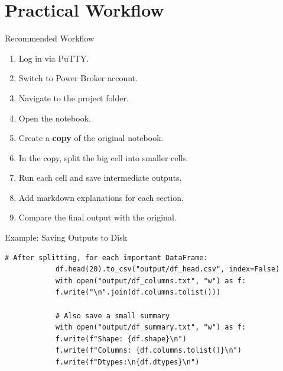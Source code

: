 \documentclass[aspectratio=169,11pt]{beamer}
\begin{document}
	\section{Practical Workflow}
	
	\begin{frame}{Recommended Workflow}
		\begin{enumerate}
			\item Log in via PuTTY.
			\item Switch to Power Broker account.
			\item Navigate to the project folder.
			\item Open the notebook.
			\item Create a \textbf{copy} of the original notebook.
			\item In the copy, split the big cell into smaller cells.
			\item Run each cell and save intermediate outputs.
			\item Add markdown explanations for each section.
			\item Compare the final output with the original.
		\end{enumerate}
	\end{frame}
	
	\begin{frame}[fragile]{Example: Saving Outputs to Disk}
		\begin{lstlisting}[caption={Save DataFrame headers and samples}]
			# After splitting, for each important DataFrame:
			df.head(20).to_csv("output/df_head.csv", index=False)
			with open("output/df_columns.txt", "w") as f:
			f.write("\n".join(df.columns.tolist()))
			
			# Also save a small summary
			with open("output/df_summary.txt", "w") as f:
			f.write(f"Shape: {df.shape}\n")
			f.write(f"Columns: {df.columns.tolist()}\n")
			f.write(f"Dtypes:\n{df.dtypes}\n")
		\end{lstlisting}
	\end{frame}
	
\end{document}
